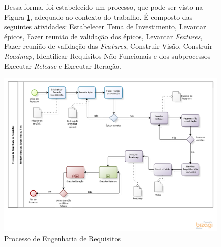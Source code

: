 \begin{figure}[!htb]

Dessa forma, foi estabelecido um processo, que pode ser visto na Figura \ref{fig:Processo}, adequado ao contexto do trabalho.
É composto das seguintes atividades: Estabelecer Tema de Investimento, Levantar épicos, Fazer reunião de validação dos épicos, 
Levantar \textit{Features}, Fazer reunião de validação das \textit{Features}, Construir Visão, Construir \textit{Roadmap}, Identificar Requisitos Não Funcionais e dos 
subprocessos Executar \textit{Release} e Executar Iteração.


\includegraphics[scale=0.5]{figuras/processo.png}
\caption{Processo de Engenharia de Requisitos}
\label{fig:Processo}
\end{figure}



